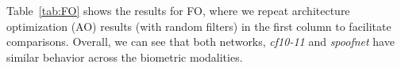 

Table~\ref{tab:FO} shows the results for FO, where we repeat architecture optimization (AO) results (with random filters) in the first column to facilitate comparisons. Overall, we can see that both networks, \emph{cf10-11} and \emph{spoofnet} have similar behavior across the biometric modalities.

